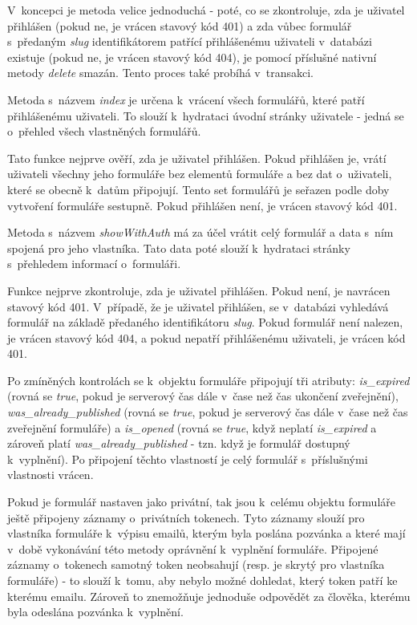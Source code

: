 			V~koncepci je metoda velice jednoduchá - poté, co se zkontroluje, zda je uživatel přihlášen (pokud ne, je vrácen stavový kód 401) a zda vůbec formulář s~předaným \textit{slug} identifikátorem patřící přihlášenému uživateli v~databázi existuje (pokud ne, je vrácen stavový kód 404), je pomocí příslušné nativní metody \textit{delete} smazán. Tento proces také probíhá v~transakci.
			
			\label{sec:form_index}
			Metoda s~názvem \textit{index} je určena k~vrácení všech formulářů, které patří přihlášenému uživateli. To slouží k~hydrataci úvodní stránky uživatele - jedná se o~přehled všech vlastněných formulářů. 
			
			Tato funkce nejprve ověří, zda je uživatel přihlášen. Pokud přihlášen je, vrátí uživateli všechny jeho formuláře bez elementů formuláře a bez dat o~uživateli, které se obecně k~datům připojují. Tento set formulářů je seřazen podle doby vytvoření formuláře sestupně. Pokud přihlášen není, je vrácen stavový kód 401. 
			
			\label{sec:form_showwithauth}
			Metoda s~názvem \textit{showWithAuth} má za účel vrátit celý formulář a data s~ním spojená pro jeho vlastníka. Tato data poté slouží k~hydrataci stránky s~přehledem informací o~formuláři.
			
			Funkce nejprve zkontroluje, zda je uživatel přihlášen. Pokud není, je navrácen stavový kód 401. V~případě, že je uživatel přihlášen, se v~databázi vyhledává formulář na základě předaného identifikátoru \textit{slug}. Pokud formulář není nalezen, je vrácen stavový kód 404, a pokud nepatří přihlášenému uživateli, je vrácen kód 401. 
			
			Po zmíněných kontrolách se k~objektu formuláře připojují tři atributy: \textit{is\_expired} (rovná se \textit{true}, pokud je serverový čas dále v~čase než čas ukončení zveřejnění), \textit{was\_already\_published} (rovná se \textit{true}, pokud je serverový čas dále v~čase než čas zveřejnění formuláře) a \textit{is\_opened} (rovná se \textit{true}, když neplatí \textit{is\_expired} a zároveň platí \textit{was\_already\_published} - tzn. když je formulář dostupný k~vyplnění). Po připojení těchto vlastností je celý formulář s~příslušnými vlastnosti vrácen.
			
			Pokud je formulář nastaven jako privátní, tak jsou k~celému objektu formuláře ještě připojeny záznamy o~privátních tokenech. Tyto záznamy slouží pro vlastníka formuláře k~výpisu emailů, kterým byla poslána pozvánka a které mají v~době vykonávání této metody oprávnění k~vyplnění formuláře. Připojené záznamy o~tokenech samotný token neobsahují (resp. je skrytý pro vlastníka formuláře) - to slouží k~tomu, aby nebylo možné dohledat, který token patří ke kterému emailu. Zároveň to znemožňuje jednoduše odpovědět za člověka, kterému byla odeslána pozvánka k~vyplnění.
			
